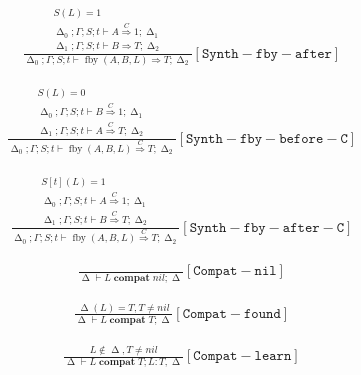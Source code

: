 \documentclass{scrartcl}
\DeclareMathOperator{\fby}{fby}
\DeclareMathOperator{\compat}{\mathbf{compat}}
\DeclareMathOperator{\gtypes}{\Delta}
\begin{document}
    \begin{align*}
    \frac{
        \begin{matrix}
        S(L) = 1 \\
        \gtypes_0; \Gamma; S; t \vdash A \overset{C}{\Rightarrow} 1; \gtypes_1 \\
        \gtypes_1; \Gamma; S; t \vdash B \Rightarrow T; \gtypes_2
        \end{matrix}
    }{
        \gtypes_0; \Gamma; S; t \vdash \fby(A, B, L) \Rightarrow T; \gtypes_2
    }[\mathtt{Synth-fby-after}]
    \end{align*}
    
    \begin{align*}
    \frac{
        \begin{matrix}
        S(L) = 0 \\
        \gtypes_0; \Gamma; S; t \vdash B \overset{C}{\Rightarrow} 1; \gtypes_1 \\
        \gtypes_1; \Gamma; S; t \vdash A \overset{C}{\Rightarrow} T; \gtypes_2
        \end{matrix}
    }{
        \gtypes_0; \Gamma; S; t \vdash \fby(A, B, L) \overset{C}{\Rightarrow} T; \gtypes_2
    }[\mathtt{Synth-fby-before-C}]
    \end{align*}
    
    \begin{align*}
    \frac{
        \begin{matrix}
        S[t](L) = 1 \\
        \gtypes_0; \Gamma; S; t \vdash A \overset{C}{\Rightarrow} 1; \gtypes_1 \\
        \gtypes_1; \Gamma; S; t \vdash B \overset{C}{\Rightarrow} T; \gtypes_2
        \end{matrix}
    }{
        \gtypes_0; \Gamma; S; t \vdash \fby(A, B, L) \overset{C}{\Rightarrow} T; \gtypes_2
    }[\mathtt{Synth-fby-after-C}]
    \end{align*}
    
    \begin{align*}
    \frac{}{
        \gtypes \vdash L \compat nil; \gtypes
    }[\mathtt{Compat-nil}]
    \end{align*}
    
    \begin{align*}
    \frac{
        \gtypes(L) = T, T \neq nil
    }{
        \gtypes \vdash L \compat T; \gtypes
    }[\mathtt{Compat-found}]
    \end{align*}
    
    \begin{align*}
    \frac{
        L \notin \gtypes, T \neq nil
    }{
        \gtypes \vdash L \compat T; L : T, \gtypes
    }[\mathtt{Compat-learn}]
    \end{align*}
    
\end{document}
